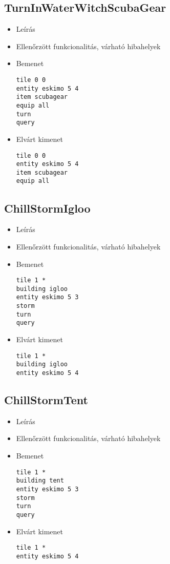 \subsection{TurnInWaterWitchScubaGear}
\begin{itemize}
\item Leírás\newline
\item Ellenőrzött funkcionalitás, várható hibahelyek
\item Bemenet
\begin{lstlisting}
tile 0 0
entity eskimo 5 4
item scubagear
equip all
turn
query
\end{lstlisting}
\item Elvárt kimenet
\begin{lstlisting}
tile 0 0
entity eskimo 5 4
item scubagear
equip all
\end{lstlisting}
\end{itemize}

\subsection{ChillStormIgloo}
\begin{itemize}
\item Leírás\newline
\item Ellenőrzött funkcionalitás, várható hibahelyek
\item Bemenet
\begin{lstlisting}
tile 1 *
building igloo
entity eskimo 5 3
storm
turn
query
\end{lstlisting}
\item Elvárt kimenet
\begin{lstlisting}
tile 1 *
building igloo
entity eskimo 5 4
\end{lstlisting}
\end{itemize}

\subsection{ChillStormTent}
\begin{itemize}
\item Leírás\newline
\item Ellenőrzött funkcionalitás, várható hibahelyek
\item Bemenet
\begin{lstlisting}
tile 1 *
building tent
entity eskimo 5 3
storm
turn
query
\end{lstlisting}
\item Elvárt kimenet
\begin{lstlisting}
tile 1 *
entity eskimo 5 4
\end{lstlisting}
\end{itemize}

